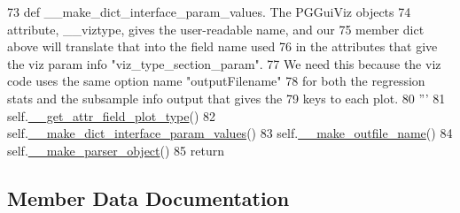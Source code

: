 \begin{DoxyCode}
73 \textcolor{stringliteral}{        def \_\_make\_dict\_interface\_param\_values.  The PGGuiViz objects }
74 \textcolor{stringliteral}{        attribute, \_\_viztype, gives the user-readable name, and our }
75 \textcolor{stringliteral}{        member dict above will translate that into the field name used }
76 \textcolor{stringliteral}{        in the attributes that give the viz param info "viz\_type\_section\_param".  }
77 \textcolor{stringliteral}{        We need this because the viz code uses the same option name "outputFilename" }
78 \textcolor{stringliteral}{        for both the regression stats and the subsample info output that gives the }
79 \textcolor{stringliteral}{        keys to each plot.}
80 \textcolor{stringliteral}{        '''}
81         self.\hyperlink{classnegui_1_1pglineregressconfigfilemaker_1_1PGLineRegressConfigFileMaker_a1728f710a22defb414709c0ec5dc5c1d}{\_\_get\_attr\_field\_plot\_type}()
82         self.\hyperlink{classnegui_1_1pglineregressconfigfilemaker_1_1PGLineRegressConfigFileMaker_a8f8b6c739e0428a439e47022e31946da}{\_\_make\_dict\_interface\_param\_values}()
83         self.\hyperlink{classnegui_1_1pglineregressconfigfilemaker_1_1PGLineRegressConfigFileMaker_a1ad95775d468ad756728e2083a48ee3f}{\_\_make\_outfile\_name}()
84         self.\hyperlink{classnegui_1_1pglineregressconfigfilemaker_1_1PGLineRegressConfigFileMaker_ad32de2e18fb152684f6a7942bb7cb623}{\_\_make\_parser\_object}()
85         \textcolor{keywordflow}{return}
\end{DoxyCode}


\subsection{Member Data Documentation}
